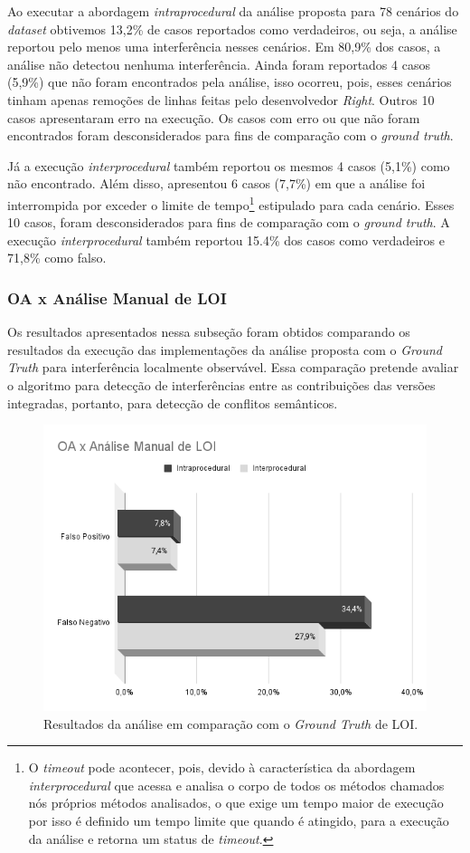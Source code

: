 Ao executar a abordagem \emph{intraprocedural} da análise proposta para 78 cenários do \emph{dataset} obtivemos 13,2\% de casos reportados como verdadeiros, ou seja, a análise reportou pelo menos uma interferência nesses cenários. Em 80,9\% dos casos, a análise não detectou nenhuma interferência. Ainda foram reportados 4 casos (5,9\%) que não foram encontrados pela análise, isso ocorreu, pois, esses cenários tinham apenas remoções de linhas feitas pelo desenvolvedor \emph{Right}. Outros 10 casos apresentaram erro na execução. Os casos com erro ou que não foram encontrados foram desconsiderados para fins de comparação com o \emph{ground truth}.

Já a execução \emph{interprocedural} também reportou os mesmos 4 casos (5,1\%) como não encontrado. Além disso, apresentou 6 casos (7,7\%) em que a análise foi interrompida por exceder o limite de tempo\footnote{O  \emph{timeout} pode acontecer, pois, devido à característica da abordagem \emph{interprocedural} que acessa e analisa o corpo de todos os métodos chamados nós próprios métodos analisados, o que exige um tempo maior de execução por isso é definido um tempo limite que quando é atingido, para a execução da análise e retorna um status de \emph{timeout}.} estipulado para cada cenário. Esses 10 casos, foram desconsiderados para fins de comparação com o \emph{ground truth}. A execução \emph{interprocedural} também reportou 15.4\% dos casos como verdadeiros e 71,8\% como falso.

\subsubsection{OA x Análise Manual de LOI}

Os resultados apresentados nessa subseção foram obtidos comparando os resultados da execução das implementações da análise proposta com o \emph{Ground Truth} para interferência localmente observável. Essa comparação pretende avaliar o algoritmo para detecção de interferências entre as contribuições das versões integradas, portanto, para detecção de conflitos semânticos.

\begin{figure}[!h]
    \centering
    \includegraphics[width=0.9\linewidth]{images/OAxAnaliseManualdeLOI.png}
    \caption{Resultados da análise em comparação com o \emph{Ground Truth} de LOI.}
    \label{fig:loi-x-groundtruthloi}
\end{figure}

